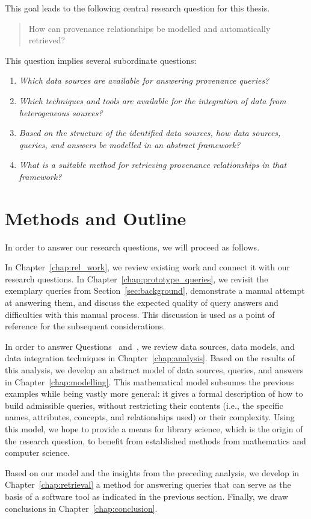 This goal leads to the following
central research question for this thesis.
%
\begin{quote}
  \begin{itshape}
    How can provenance relationships be modelled and automatically retrieved?
  \end{itshape}
\end{quote}
%
This question implies several subordinate questions:
%
\begin{enumerate}
  \item[\subquestion{1}]
    \emph{Which data sources are available for answering provenance queries?}
  \item[\subquestion{2}]
    \emph{Which techniques and tools are available for the integration
    of data from heterogeneous sources?}
  \item[\subquestion{3}]
    \emph{Based on the structure of the identified data sources,
    how data sources, queries, and answers be modelled in an abstract framework?}
  \item[\subquestion{4}]
    \emph{What is a suitable method for retrieving provenance relationships
    in that framework?}
\end{enumerate}


\section{Methods and Outline}
\label{sec:methods}

In order to answer our research questions, we will proceed as follows.

In Chapter~\ref{chap:rel_work}, we review existing work 
and connect it with our research questions.
In Chapter~\ref{chap:prototype_queries}, we revisit
the exemplary queries from Section~\ref{sec:background},
demonstrate a manual attempt at answering them,
and discuss the expected quality of query answers and difficulties with this manual process.
This discussion is used as a point of reference for the subsequent considerations.

In order to answer Questions~ and~, we review
data sources, data models, and data integration techniques in Chapter~\ref{chap:analysis}.
Based on the results of this analysis, we develop an abstract model of
data sources, queries, and answers in Chapter~\ref{chap:modelling}.
This mathematical model subsumes the previous examples
while being vastly more general: it gives a formal description of how to
build admissible queries, without restricting their contents
(i.e., the specific names, attributes, concepts, and relationships used)
or their complexity. Using this model, we hope to provide a means
for library science, which is the origin of the research question,
to benefit from established methods from mathematics and computer science.

Based on our model and the insights from the preceding analysis,
we develop in Chapter~\ref{chap:retrieval}
a method for answering queries that can serve as the basis of a software tool
as indicated in the previous section.
Finally, we draw conclusions in Chapter~\ref{chap:conclusion}.

